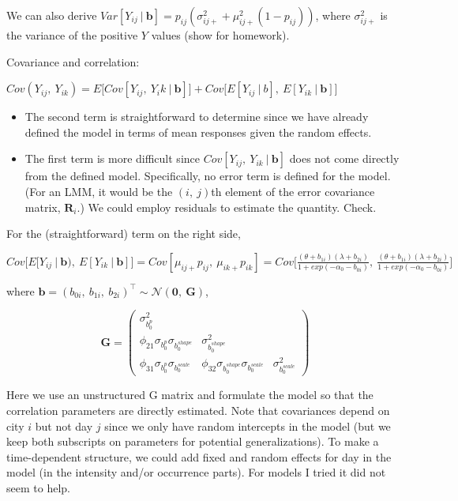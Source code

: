 \documentclass[
  9pt,
  ignorenonframetext,
]{beamer}
\begin{document}
\begin{frame}{}
\protect\hypertarget{section-4}{}
We can also derive
\(Var[Y_{ij} \ |\ \pmb b]=p_{ij} ( \sigma _{ij+}^2+ \mu_{ij+}^2 (1-p_{ij}))\),
where \(\sigma _{ij+}^2\) is the variance of the positive \(Y\) values
(show for homework).

Covariance and correlation:

\(Cov(Y_{ij},\ Y_{ik})=E\big[Cov[Y_{ij},\ Y_ik \ |\ \pmb b]\big]+Cov\big[E[Y_{ij} \ |\ b],\ E[Y_{ik} \ |\ \pmb b]\big]\)

\begin{itemize}
\item
  The second term is straightforward to determine since we have already
  defined the model in terms of mean responses given the random effects.
\item
  The first term is more difficult since
  \(Cov[Y_{ij},\ Y_{ik} \ |\ \pmb b]\) does not come directly from the
  defined model. Specifically, no error term is defined for the model.
  (For an LMM, it would be the \((i,\ j)\)th element of the error
  covariance matrix, \(\pmb R_i\).) We could employ residuals to
  estimate the quantity. Check.
\end{itemize}
\end{frame}

\begin{frame}{}
\protect\hypertarget{section-5}{}
For the (straightforward) term on the right side,

\(Cov\big[ E[Y_{ij} \ |\ \pmb b),\ E[Y_{ik} \ |\ \pmb b]\big]=Cov[\mu_{ij+} p_{ij},\ \mu _{ik+} p_{ik}]=Cov\Big[\frac {(\theta +b_{1i})(\lambda+b_{2i})} {1+exp (-\alpha _0-b_{0i})},\ \frac {(\theta +b_{1i})(\lambda+b_{2i})} {1+exp(-\alpha_0-b_{0i})} \Big]\)

where
\(\pmb b=(b_{0i},\ b_{1i},\ b_{2i} )^{\top} \sim \mathcal N(\pmb 0,\ \pmb G)\),

\[
\pmb G=
\begin{pmatrix}
\sigma _{b_0^p}^2&& \\ 
\phi_{21}  \sigma_{b_0^p}   \sigma _{b_0^{shape}}& \sigma _{b_0^{shape}}^2& \\ \phi_{31}  \sigma _{b_0^p}   \sigma _{b_0^{scale}}&\phi_{32}  \sigma _{b_0^{shape}}   \sigma _{b_0^{scale}} & \sigma _{b_0^{scale}}^2 
\end{pmatrix}
\]

Here we use an unstructured G matrix and formulate the model so that the
correlation parameters are directly estimated. Note that covariances
depend on city \(i\) but not day \(j\) since we only have random
intercepts in the model (but we keep both subscripts on parameters for
potential generalizations). To make a time-dependent structure, we could
add fixed and random effects for day in the model (in the intensity
and/or occurrence parts). For models I tried it did not seem to help.
\end{frame}
\end{document}
